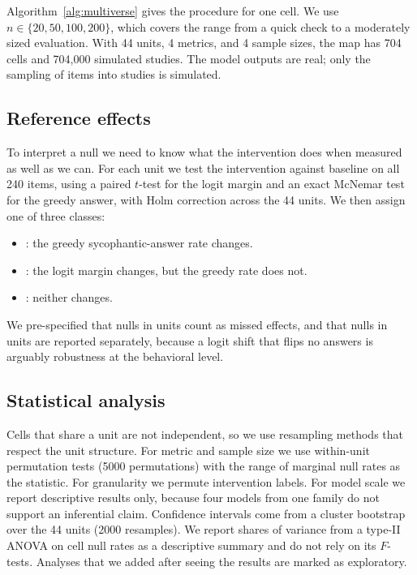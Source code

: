 Algorithm~\ref{alg:multiverse} gives the procedure for one cell.
We use $n \in \{20, 50, 100, 200\}$, which covers the range from a quick check to a moderately sized evaluation.
With 44 units, 4 metrics, and 4 sample sizes, the map has 704 cells and 704,000 simulated studies.
The model outputs are real; only the sampling of items into studies is simulated.

\subsection{Reference effects}
\label{sec:reference}

To interpret a null we need to know what the intervention does when measured as well as we can.
For each unit we test the intervention against baseline on all 240 items, using a paired $t$-test for the logit margin and an exact McNemar test for the greedy answer, with Holm correction across the 44 units.
We then assign one of three classes:
\begin{itemize}[leftmargin=*,itemsep=0pt,topsep=0pt]
    \item \behav: the greedy sycophantic-answer rate changes.
    \item \latent: the logit margin changes, but the greedy rate does not.
    \item \noeff: neither changes.
\end{itemize}
We pre-specified that nulls in \behav units count as missed effects, and that nulls in \latent units are reported separately, because a logit shift that flips no answers is arguably robustness at the behavioral level.

\subsection{Statistical analysis}

Cells that share a unit are not independent, so we use resampling methods that respect the unit structure.
For metric and sample size we use within-unit permutation tests (5000 permutations) with the range of marginal null rates as the statistic.
For granularity we permute intervention labels.
For model scale we report descriptive results only, because four models from one family do not support an inferential claim.
Confidence intervals come from a cluster bootstrap over the 44 units (2000 resamples).
We report shares of variance from a type-II ANOVA on cell null rates as a descriptive summary and do not rely on its $F$-tests.
Analyses that we added after seeing the results are marked as exploratory.
